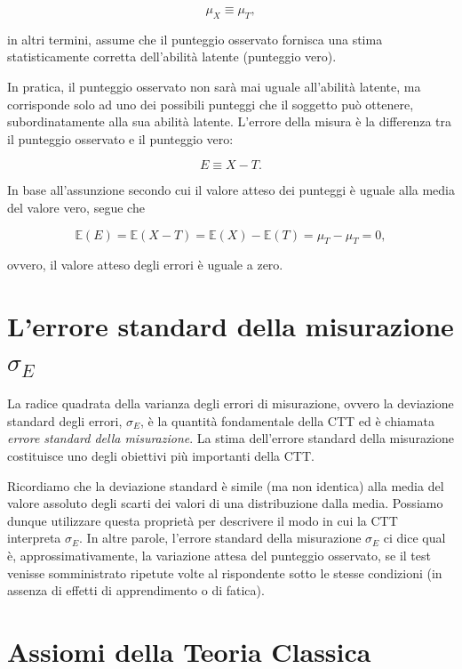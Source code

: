 \documentclass[
  11pt,
]{krantz}
\newcommand{\E}{\mathbb{E}} %
\theoremstyle{definition}
\theoremstyle{definition}
\theoremstyle{definition}
\theoremstyle{definition}
\theoremstyle{remark}
\begin{document}
\[
\mu_X \equiv \mu_{T},
\label{eq:assunzione-media-x-media-t}
\]

in altri termini, assume che il punteggio osservato fornisca una stima statisticamente corretta dell'abilità latente (punteggio vero).

In pratica, il punteggio osservato non sarà mai uguale all'abilità latente, ma corrisponde solo ad uno dei possibili punteggi che il soggetto può ottenere, subordinatamente alla sua abilità latente. L'errore della misura è la differenza tra il punteggio osservato e il punteggio vero:

\[E \equiv X - T.\]

In base all'assunzione secondo cui il valore atteso dei punteggi è uguale alla media del valore vero, segue che

\[
\E(E) = \E(X - T) = \E(X) - \E(T) = \mu_{T} - \mu_{T} = 0,
\]

ovvero, il valore atteso degli errori è uguale a zero.

\hypertarget{lerrore-standard-della-misurazione-sigma_e}{%
\section{\texorpdfstring{L'errore standard della misurazione \(\sigma_E\)}{L'errore standard della misurazione \textbackslash sigma\_E}}\label{lerrore-standard-della-misurazione-sigma_e}}

La radice quadrata della varianza degli errori di misurazione, ovvero la deviazione standard degli errori, \(\sigma_E\), è la quantità fondamentale della CTT ed è chiamata \emph{errore standard della misurazione}. La stima dell'errore standard della misurazione costituisce uno degli obiettivi più importanti della CTT.

Ricordiamo che la deviazione standard è simile (ma non identica) alla media del valore assoluto degli scarti dei valori di una distribuzione dalla media. Possiamo dunque utilizzare questa proprietà per descrivere il modo in cui la CTT interpreta \(\sigma_E\). In altre parole, l'errore standard della misurazione \(\sigma_E\) ci dice qual è, approssimativamente, la variazione attesa del punteggio osservato, se il test venisse somministrato ripetute volte al rispondente sotto le stesse condizioni (in assenza di effetti di apprendimento o di fatica).

\hypertarget{assiomi-della-teoria-classica}{%
\section{Assiomi della Teoria Classica}\label{assiomi-della-teoria-classica}}
\end{document}
